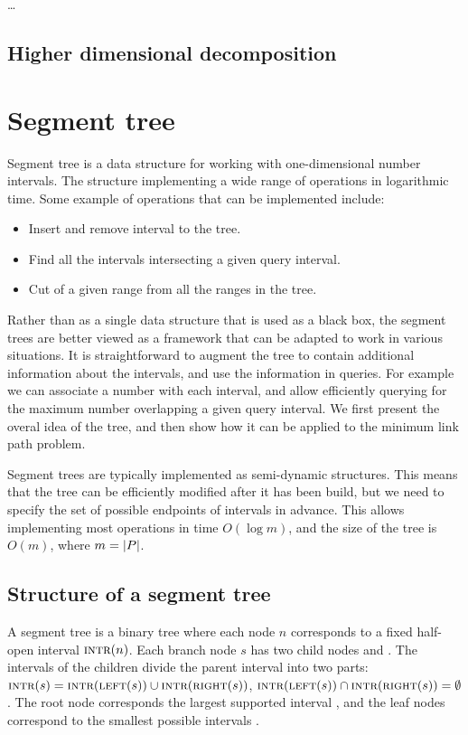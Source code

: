 \documentclass[english,gradu]{tktltiki2018}
\begin{document}
\dots

\subsection{Higher dimensional decomposition}



\section{Segment tree}\label{sec:segtree}

Segment tree is a data structure for working with one-dimensional number intervals.
The structure implementing a wide range of operations in logarithmic time.
Some example of operations that can be implemented include:
\begin{itemize}
	\item Insert and remove interval to the tree.
	\item Find all the intervals intersecting a given query interval.
	\item Cut of a given range from all the ranges in the tree.
\end{itemize}

Rather than as a single data structure that is used as a black box, the segment trees are better viewed as a framework that can be adapted to work in various situations.
It is straightforward to augment the tree to contain additional information about the intervals, and use the information in queries.
For example we can associate a number with each interval, and allow efficiently querying for the maximum number overlapping a given query interval.
We first present the overal idea of the tree, and then show how it can be applied to the minimum link path problem.

Segment trees are typically implemented as semi-dynamic structures.
This means that the tree can be efficiently modified after it has been build, but we need to specify the set of possible endpoints \epts of intervals in advance.
This allows implementing most operations in time $O(\log m)$, and the size of the tree is $O(m)$, where $m=\left |P\right |$.

\subsection{Structure of a segment tree}

A segment tree is a binary tree where each node $n$ corresponds to a fixed half-open interval $\textsc{intr}(n)$.
Each branch node $s$ has two child nodes  and .
The intervals of the children divide the parent interval into two parts:
$\textsc{intr}(s)=\textsc{intr}(\textsc{left}(s))\cup\textsc{intr}(\textsc{right}(s))$, $\textsc{intr}(\textsc{left}(s))\cap\textsc{intr}(\textsc{right}(s))=\emptyset$.
The root node corresponds the largest supported interval \range{\epts[1]}{\epts[m]}, and the leaf nodes correspond to the smallest possible intervals \range{\epts[i]}{\epts[i+1]}.
\end{document}
